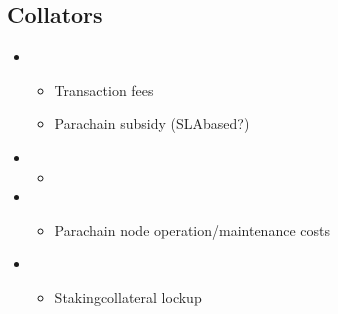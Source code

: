 \documentclass[a4paper,10pt,english]{sphinxmanual}
\begin{document}
\subsection{Collators}
\label{\detokenize{economics/fees:collators}}\begin{itemize}
\item {} 
\begin{itemize}
\item {} 
Transaction fees

\item {} 
Parachain subsidy (SLA\sphinxhyphen{}based?)

\end{itemize}

\item {} 
\begin{itemize}
\item {} 

\end{itemize}

\item {} 
\begin{itemize}
\item {} 
Parachain node operation/maintenance costs

\end{itemize}

\item {} 
\begin{itemize}
\item {} 
Staking\sphinxhyphen{}collateral lockup

\end{itemize}

\end{itemize}
\end{document}
